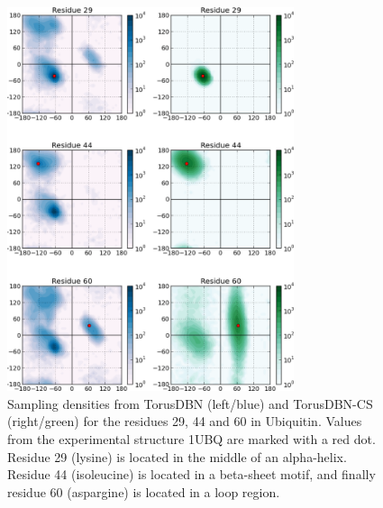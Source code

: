 \begin{figure}
    \centering
    \includegraphics[width=0.75\textwidth]{figures/torus_versions.pdf}
    \caption{Sampling densities from TorusDBN (left/blue) and TorusDBN-CS (right/green) for the residues 29, 44 and 60 in Ubiquitin. Values from the experimental structure 1UBQ are marked with a red dot. Residue 29 (lysine) is located in the middle of an alpha-helix. Residue 44 (isoleucine) is located in a beta-sheet motif, and finally residue 60 (aspargine) is located in a loop region.}
    \label{fig:torus}
\end{figure}


% 
% 
% 

